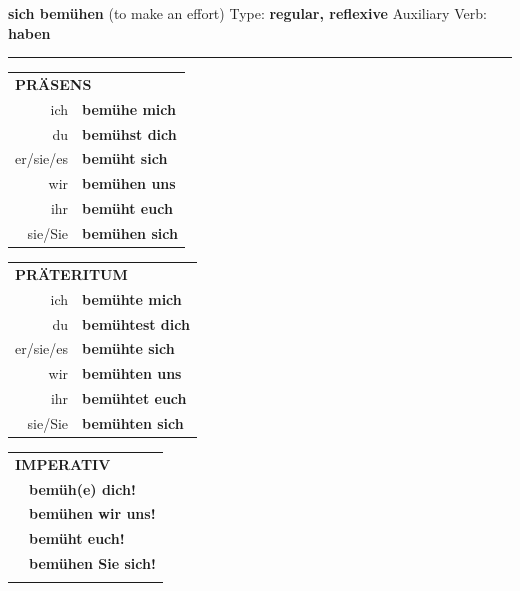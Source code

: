 \documentclass[10pt,a4paper]{revtex4-2}
\begin{document}
\begin{verbbox}
    {\Large \bf sich bemühen} (to make an effort) \hfill Type: \textbf{regular, reflexive} \hfill Auxiliary Verb: \textbf{haben} 
    
     \vspace{5pt}

    \hrule
    
    \vspace{5pt}

  \begin{tabular}{rl}
     \multicolumn{2}{l}{\textbf{PRÄSENS} }\\
    ich & \textbf{bemühe mich}\\
    du & \textbf{bemühst dich}\\
    er/sie/es & \textbf{bemüht sich}\\
    wir & \textbf{bemühen uns}\\
    ihr & \textbf{bemüht euch}\\
    sie/Sie & \textbf{bemühen sich}\\
  \end{tabular}
  \hfill
     \begin{tabular}{rl}
    \multicolumn{2}{l}{\textbf{PRÄTERITUM} }\\
    ich & \textbf{bemühte mich}\\
    du & \textbf{bemühtest dich}\\
    er/sie/es & \textbf{bemühte sich}\\
    wir & \textbf{bemühten uns}\\
    ihr & \textbf{bemühtet euch}\\
    sie/Sie & \textbf{bemühten sich}\\
  \end{tabular}
  \hfill
  \begin{tabular}{rl}
     \multicolumn{2}{l}{\textbf{IMPERATIV} }\\
   & \textbf{bemüh(e) dich!}\\
   & \textbf{bemühen wir uns!}\\
   & \textbf{bemüht euch!}\\
   & \textbf{bemühen Sie sich!}\\
   & \vspace{10pt}
  \end{tabular}

    \vspace{10pt}


\end{verbbox}
\end{document}
